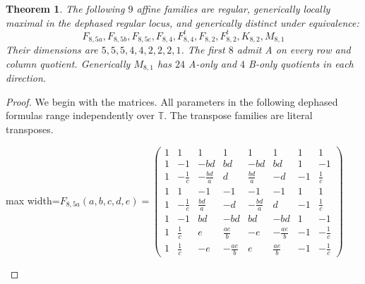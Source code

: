 \documentclass[11pt,a4paper]{article}
\newtheorem{theorem}{Theorem}[section]
\theoremstyle{plain}
\theoremstyle{definition}
\numberwithin{equation}{section}
\begin{document}
\begin{theorem}\label{thm:families}
The following $9$ affine families are regular, generically locally maximal in the dephased regular locus, and generically distinct under equivalence:
$$F_{8,5a},F_{8,5b},F_{8,5c},F_{8,4},F_{8,4}^{t},F_{8,2},F_{8,2}^{t},K_{8,2},M_{8,1}$$
Their dimensions are $5,5,5,4,4,2,2,2,1$. The first $8$ admit A on every row and column quotient. Generically $M_{8,1}$ has $24$ A-only and $4$ B-only quotients in each direction.
\end{theorem}
\begin{proof}
We begin with the matrices. All parameters in the following dephased formulas range independently over $\mathbb T$. The transpose families are literal transposes.
\begin{center}\small\setlength{\arraycolsep}{3.4pt}
\begin{adjustbox}{max width=\textwidth}$\displaystyle F_{8,5a}(a,b,c,d,e)=\begin{pmatrix}
1 & 1 & 1 & 1 & 1 & 1 & 1 & 1 \\
1 & -1 & -bd & bd & -bd & bd & 1 & -1 \\
1 & -\frac{1}{c} & -\frac{bd}{a} & d & \frac{bd}{a} & -d & -1 & \frac{1}{c} \\
1 & 1 & -1 & -1 & -1 & -1 & 1 & 1 \\
1 & -\frac{1}{c} & \frac{bd}{a} & -d & -\frac{bd}{a} & d & -1 & \frac{1}{c} \\
1 & -1 & bd & -bd & bd & -bd & 1 & -1 \\
1 & \frac{1}{c} & e & \frac{ae}{b} & -e & -\frac{ae}{b} & -1 & -\frac{1}{c} \\
1 & \frac{1}{c} & -e & -\frac{ae}{b} & e & \frac{ae}{b} & -1 & -\frac{1}{c}
\end{pmatrix}$\end{adjustbox}
\end{center}
\medskip
\begin{center}\small\setlength{\arraycolsep}{3.4pt}
\end{center}
\end{proof}
\end{document}
